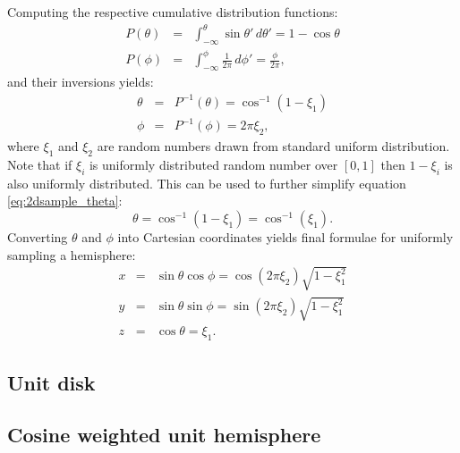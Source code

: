 Computing the respective cumulative distribution functions:
\begin{eqnarray}
  P(\theta) &=& \int_{-\infty}^{\theta} \sin\theta' \,d\theta' = 1 - \cos\theta \\
  P(\phi) &=& \int_{-\infty}^{\phi} \frac{1}{2\pi} \,d\phi' = \frac{\phi}{2\pi},
\end{eqnarray}
and their inversions yields:
\begin{eqnarray}
  \theta &=& P^{-1}(\theta) = \cos^{-1}(1 - \xi_{1}) \label{eq:2dsample_theta} \\
  \phi &=& P^{-1}(\phi) = 2\pi \xi_{2},
\end{eqnarray}
where $\xi_{1}$ and $\xi_{2}$ are random numbers drawn from standard uniform distribution. Note that if $\xi_{i}$ is uniformly distributed random number over $[0,1]$ then $1-\xi_{i}$ is also uniformly distributed. This can be used to further simplify equation \ref{eq:2dsample_theta}:
\begin{equation}
  \theta = \cos^{-1}(1-\xi_{1}) = \cos^{-1}(\xi_{1}).
\end{equation}
Converting $\theta$ and $\phi$ into Cartesian coordinates yields final formulae for uniformly sampling a hemisphere:
\begin{eqnarray}
  x &=& \sin\theta \cos\phi = \cos(2\pi \xi_{2}) \sqrt{1 - \xi_{1}^{2}} \nonumber \\
  y &=& \sin\theta \sin\phi = \sin(2\pi \xi_{2}) \sqrt{1 - \xi_{1}^{2}} \\
  z &=& \cos\theta = \xi_{1}. \nonumber
\end{eqnarray}

\subsection{Unit disk}

\subsection{Cosine weighted unit hemisphere}

